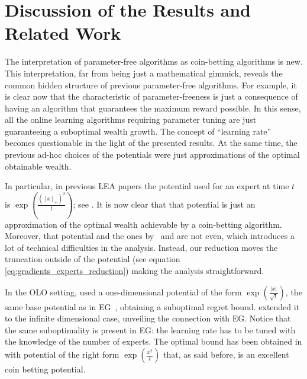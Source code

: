 \section{Discussion of the Results and Related Work}
\label{sec:discussion}

The interpretation of parameter-free algorithms as coin-betting algorithms is
new. This interpretation, far from being just a mathematical gimmick, reveals
the common hidden structure of previous parameter-free algorithms. For example,
it is clear now that the characteristic of parameter-freeness is just a
consequence of having an algorithm that guarantees the maximum reward possible.
In this sense, all the online learning algorithms requiring parameter tuning
are just guaranteeing a suboptimal wealth growth. The concept of
``learning rate'' becomes questionable in the light of the presented results.
At the same time, the previous ad-hoc choices of the potentials were just
approximations of the optimal obtainable wealth.

In particular, in previous \ac{LEA} papers the potential used for an expert at
time $t$ is $\exp \left(\frac{([x]_+)^2}{t} \right)$; see \citep{Chaudhuri-Freund-Hsu-2009,
Luo-Schapire-2014, Luo-Schapire-2015}. It is now clear that that potential is
just an approximation of the optimal wealth achievable by a coin-betting
algorithm.  Moreover, that potential and the ones by~\citet{Chernov-Vovk-2010}
and \cite{Koolen-van-Erven-2015} are not even, which introduces a lot of
technical difficulties in the analysis. Instead, our reduction moves the
truncation outside of the potential (see equation
\eqref{eq:gradients_experts_reduction}) making the analysis straightforward.

In the \ac{OLO} setting, \citet{Streeter-McMahan-2012} used a one-dimensional
potential of the form $\exp \left(\frac{|x|}{\sqrt{t}}\right)$, the same base
potential as in \ac{EG}~\citep{Kivinen-Warmuth-1997}, obtaining a suboptimal
regret bound.  \citet{Orabona-2013} extended it to the infinite dimensional
case, unveiling the connection with \ac{EG}.  Notice that the same
suboptimality is present in \ac{EG}: the learning rate has to be tuned with the
knowledge of the number of experts.  The optimal bound has been obtained in
\citet{McMahan-Orabona-2014} with potential of the right form $\exp
\left(\frac{x^2}{t}\right)$ that, as said before, is an excellent coin betting potential.

